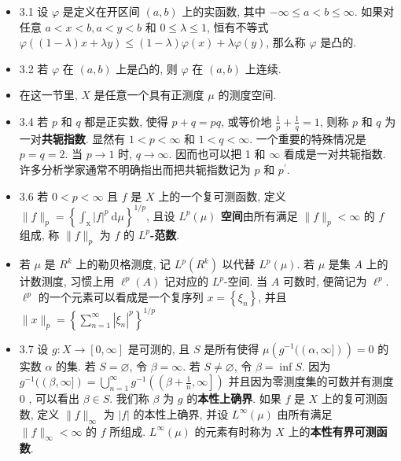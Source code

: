 \begin{itemize}
\item 3.1 设 $\varphi$ 是定义在开区间 $(a, b)$ 上的实函数, 其中 $-\infty \leqslant a<b \leqslant \infty$. 如果对任意 $a<x<b, a<y<b$ 和 $0 \leqslant \lambda \leqslant 1$, 恒有不等式 $\varphi((1-\lambda) x+\lambda y) \leqslant(1-\lambda) \varphi(x)+\lambda \varphi(y)$, 那么称 $\varphi$ 是凸的.

\item 3.2 若 $\varphi$ 在 $(a, b)$ 上是凸的, 则 $\varphi$ 在 $(a, b)$ 上连续.

\item 在这一节里, $X$ 是任意一个具有正测度 $\mu$ 的测度空间.

\item 3.4 若 $p$ 和 $q$ 都是正实数, 使得 $p+q=p q$, 或等价地 $\frac{1}{p}+\frac{1}{q}=1$, 则称 $p$ 和 $q$ 为一对\textbf{共轭指数}. 显然有 $1<p<\infty$ 和 $1<q<\infty$. 一个重要的特殊情况是 $p=q=2$. 当 $p \rightarrow 1$ 时, $q \rightarrow \infty$. 因而也可以把 1 和 $\infty$ 看成是一对共轭指数. 许多分析学家通常不明确指出而把共轭指数记为 $p$ 和 $p^{\prime}$.

\item 3.6 若 $0<p<\infty$ 且 $f$ 是 $X$ 上的一个复可测函数, 定义 $\|f\|_{p}=\left\{\int_{\mathrm{x}}|f|^{p} \mathrm{~d} \mu\right\}^{1 / p}$, 且设 \textbf{$L^{p}(\mu)$ 空间}由所有满足 $\|f\|_{p}<\infty$ 的 $f$ 组成, 称 $\|f\|_{p}$ 为 $f$ 的 \textbf{$L^{p}$-范数}.

\item 若 $\mu$ 是 $R^{k}$ 上的勒贝格测度, 记 $L^{p}\left(R^{k}\right)$ 以代替 $L^{p}(\mu)$. 若 $\mu$ 是集 $A$ 上的计数测度, 习惯上用 $\ell^{p}(A)$ 记对应的 $L^{p}$-空间. 当 $A$ 可数时, 便简记为 $\ell^{p}$. $\ell^{p}$ 的一个元素可以看成是一个复序列 $x=\left\{\xi_{n}\right\}$, 并且 $\|x\|_{p}=\left\{\sum_{n=1}^{\infty}\left|\xi_{n}\right|^{p}\right\}^{1 / p}$

\item 3.7 设 $g: X \rightarrow[0, \infty]$ 是可测的, 且 $S$ 是所有使得 $\mu\left(g^{-1}((\alpha, \infty])\right)=0$ 的实数 $\alpha$ 的集. 若 $S=\varnothing$, 令 $\beta=\infty$. 若 $S \neq \varnothing$, 令 $\beta=\inf S$. 因为 $g^{-1}((\beta, \infty])=\bigcup_{n=1}^{\infty} g^{-1}\left(\left(\beta+\frac{1}{n}, \infty\right]\right)$ 并且因为零测度集的可数并有测度 0 , 可以看出 $\beta \in S$. 我们称 $\beta$ 为 $g$ 的\textbf{本性上确界}. 如果 $f$ 是 $X$ 上的复可测函数, 定义 $\|f\|_{\infty}$ 为 $|f|$ 的本性上确界, 并设 $L^{\infty}(\mu)$ 由所有满足 $\|f\|_{\infty}<\infty$ 的 $f$ 所组成. $L^{\infty}(\mu)$ 的元素有时称为 $X$ 上的\textbf{本性有界可测函数}.


\end{itemize}
